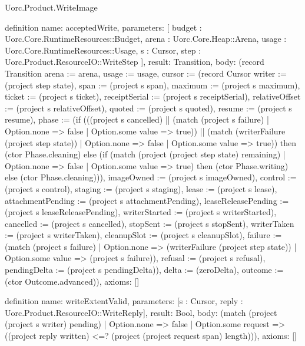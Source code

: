 \begin{lexlean}{Uorc.Product.WriteImage}
\begin{semanticmodule}
definition{
  name: acceptedWrite,
  parameters: [
    budget : Uorc.Core.RuntimeResources::Budget,
    arena : Uorc.Core.Heap::Arena,
    usage : Uorc.Core.RuntimeResources::Usage,
    s : Cursor,
    step : Uorc.Product.ResourceIO::WriteStep
  ],
  result: Transition,
  body: (record Transition {arena := arena, usage := usage, cursor := (record Cursor {writer := (project step state), span := (project s span), maximum := (project s maximum), ticket := (project s ticket), receiptSerial := (project s receiptSerial), relativeOffset := (project s relativeOffset), quoted := (project s quoted), resume := (project s resume), phase := (if (((project s cancelled) || (match (project s failure)
    | Option.none => false
    | Option.some value => true)) || (match (writerFailure (project step state))
    | Option.none => false
    | Option.some value => true)) then (ctor Phase.cleaning) else (if (match (project (project step state) remaining)
    | Option.none => false
    | Option.some value => true) then (ctor Phase.writing) else (ctor Phase.cleaning))), imageOwned := (project s imageOwned), control := (project s control), staging := (project s staging), lease := (project s lease), attachmentPending := (project s attachmentPending), leaseReleasePending := (project s leaseReleasePending), writerStarted := (project s writerStarted), cancelled := (project s cancelled), stopSent := (project s stopSent), writerTaken := (project s writerTaken), cleanupSlot := (project s cleanupSlot), failure := (match (project s failure)
    | Option.none => (writerFailure (project step state))
    | Option.some value => (project s failure)), refusal := (project s refusal), pendingDelta := (project s pendingDelta)}), delta := (zeroDelta), outcome := (ctor Outcome.advanced)}),
  axioms: []
}

definition{
  name: writeExtentValid,
  parameters: [s : Cursor, reply : Uorc.Product.ResourceIO::WriteReply],
  result: Bool,
  body: (match (project (project s writer) pending)
    | Option.none => false
    | Option.some request => ((project reply written) <=? (project (project request span) length))),
  axioms: []
}


\end{semanticmodule}
\end{lexlean}
